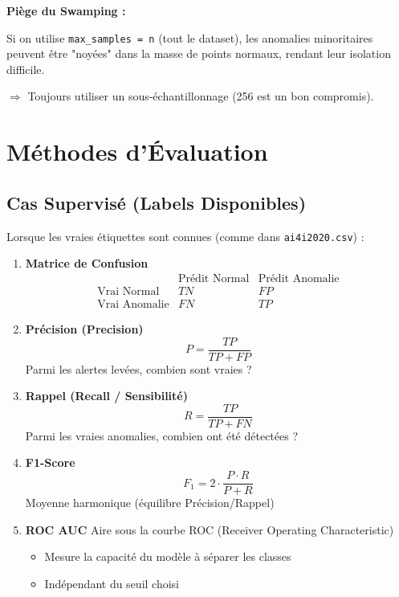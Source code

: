 \documentclass[a4paper,11pt]{article}
\begin{document}
\begin{warningbox}
\textbf{Piège du Swamping :}

Si on utilise \texttt{max\_samples = n} (tout le dataset), les anomalies minoritaires peuvent être "noyées" dans la masse de points normaux, rendant leur isolation difficile.

$\Rightarrow$ Toujours utiliser un sous-échantillonnage (256 est un bon compromis).
\end{warningbox}

\section{Méthodes d'Évaluation}

\subsection{Cas Supervisé (Labels Disponibles)}

Lorsque les vraies étiquettes sont connues (comme dans \texttt{ai4i2020.csv}) :

\begin{enumerate}
    \item \textbf{Matrice de Confusion}
    $$\begin{array}{c|cc}
     & \text{Prédit Normal} & \text{Prédit Anomalie} \\
    \hline
    \text{Vrai Normal} & TN & FP \\
    \text{Vrai Anomalie} & FN & TP
    \end{array}$$
    
    \item \textbf{Précision (Precision)}
    $$P = \frac{TP}{TP + FP}$$
    Parmi les alertes levées, combien sont vraies ?
    
    \item \textbf{Rappel (Recall / Sensibilité)}
    $$R = \frac{TP}{TP + FN}$$
    Parmi les vraies anomalies, combien ont été détectées ?
    
    \item \textbf{F1-Score}
    $$F_1 = 2 \cdot \frac{P \cdot R}{P + R}$$
    Moyenne harmonique (équilibre Précision/Rappel)
    
    \item \textbf{ROC AUC}
    Aire sous la courbe ROC (Receiver Operating Characteristic)
    \begin{itemize}
        \item Mesure la capacité du modèle à séparer les classes
        \item Indépendant du seuil choisi
    \end{itemize}
\end{enumerate}
\end{document}
